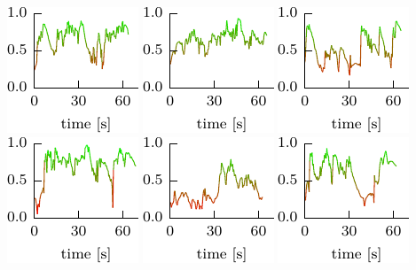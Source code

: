 \documentclass[lualatex,aspectratio=169,xcolor=dvipsnames,10pt,c]{beamer}
\begin{document}
{	\includegraphics[width=.15\textwidth]{breugel_babel-conf} \hfill
	\includegraphics[width=.15\textwidth]{van-gogh_starry-night-conf} \hfill
	\includegraphics[width=.15\textwidth]{kandinsky_comp-8-conf} \hfill
	\includegraphics[width=.15\textwidth]{vermeer_girl-pearl-conf} \hfill
	\includegraphics[width=.15\textwidth]{babar-conf} \hfill
	\includegraphics[width=.15\textwidth]{child-drawing_tooth-fairy-conf}
}
\end{document}
